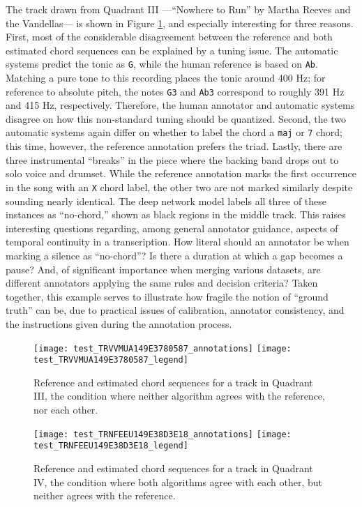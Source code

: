 The track drawn from Quadrant III ---``Nowhere to Run'' by Martha Reeves and the Vandellas--- is shown in Figure \ref{fig:test_quadIII}, and especially interesting for three reasons.
First, most of the considerable disagreement between the reference and both estimated chord sequences can be explained by a tuning issue.
The automatic systems predict the tonic as \texttt{G}, while the human reference is based on \texttt{Ab}.
Matching a pure tone to this recording places the tonic around 400 Hz;
for reference to absolute pitch, the notes \texttt{G3} and \texttt{Ab3} correspond to roughly 391 Hz and 415 Hz, respectively.
Therefore, the human annotator and automatic systems disagree on how this non-standard tuning should be quantized.
Second, the two automatic systems again differ on whether to label the chord a \texttt{maj} or \texttt{7} chord;
this time, however, the reference annotation prefers the triad.
Lastly, there are three instrumental ``breaks'' in the piece where the backing band drops out to solo voice and drumset.
While the reference annotation marks the first occurrence in the song with an \texttt{X} chord label, the other two are not marked similarly despite sounding nearly identical.
The deep network model labels all three of these instances as ``no-chord,'' shown as black regions in the middle track.
This raises interesting questions regarding, among general annotator guidance, aspects of temporal continuity in a transcription.
How literal should an annotator be when marking a silence as ``no-chord''?
Is there a duration at which a gap becomes a pause?
And, of significant importance when merging various datasets, are different annotators applying the same rules and decision criteria?
Taken together, this example serves to illustrate how fragile the notion of ``ground truth'' can be, due to practical issues of calibration, annotator consistency, and the instructions given during the annotation process.


\begin{figure}[t!]
\centering
\texttt{[image: test\_TRVVMUA149E3780587\_annotations]}
\texttt{[image: test\_TRVVMUA149E3780587\_legend]}
\caption{Reference and estimated chord sequences for a track in Quadrant III, the condition where neither algorithm agrees with the reference, nor each other.}
\label{fig:test_quadIII}
\end{figure}

\begin{figure}[t!]
\centering
\texttt{[image: test\_TRNFEEU149E38D3E18\_annotations]}
\texttt{[image: test\_TRNFEEU149E38D3E18\_legend]}
\caption{Reference and estimated chord sequences for a track in Quadrant IV, the condition where both algorithms agree with each other, but neither agrees with the reference.}
\label{fig:test_quadIV}
\end{figure}

